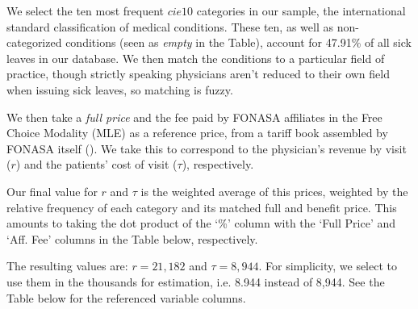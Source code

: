 \documentclass[../main.tex]{subfiles}
\begin{document}
We select the ten most frequent $cie10$ categories in our sample, the international standard classification of medical conditions. These ten, as well as non-categorized conditions (seen as \textit{empty} in the Table), account for 47.91\% of all sick leaves in our database. We then match the conditions to a particular field of practice, though strictly speaking physicians aren't reduced to their own field when issuing sick leaves, so matching is fuzzy.

We then take a \textit{full price} and the {fee} paid by FONASA affiliates in the Free Choice Modality (MLE) as a reference price, from a tariff book assembled by FONASA itself (\citeyear{fonasa}). We take this to correspond to the physician's revenue by visit ($r$) and the patients' cost of visit ($\tau$), respectively.

Our final value for $r$ and $\tau$ is the weighted average of this prices, weighted by the relative frequency of each category and its matched full and benefit price. This amounts to taking the dot product of the `\%' column with the `Full Price' and `Aff. Fee' columns in the Table below, respectively.

The resulting values are: $r = 21,182$ and $\tau = 8,944$. For simplicity, we select to use them in the thousands for estimation, i.e. 8.944 instead of 8,944. See the Table below for the referenced variable columns.
\end{document}
